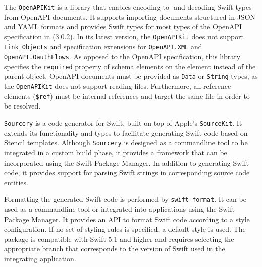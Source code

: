 The \texttt{OpenAPIKit} is a library that enables encoding to- and decoding Swift types from OpenAPI documents. It supports importing documents structured in JSON and YAML formats and provides Swift types for most types of the OpenAPI specification in (3.0.2). In its latest version, the \texttt{OpenAPIKit} does not support \texttt{Link Objects} and specification extensions for \texttt{OpenAPI.XML} and \texttt{OpenAPI.Oauth\-Flows}. As opposed to the OpenAPI specification, this library specifies the \texttt{re\-qui\-red} property of schema elements on the element instead of the parent object. OpenAPI documents must be provided as \texttt{Data} or \texttt{String} types, as the \texttt{OpenAPIKit} does not support reading files. Furthermore, all reference elements (\texttt{\$ref}) must be internal references and target the same file in order to be resolved.

\texttt{Sourcery} is a code generator for Swift, built on top of Apple's \texttt{SourceKit}. It extends its functionality and types to facilitate generating Swift code based on Stencil templates. Although \texttt{Sourcery} is designed as a commandline tool to be integrated in a custom build phase, it provides a framework that can be incorporated using the Swift Package Manager. In addition to generating Swift code, it provides support for parsing Swift strings in corresponding source code entities. 

Formatting the generated Swift code is performed by \texttt{swift-format}. It can be used as a commandline tool or integrated into applications using the Swift Package Manager. It provides an API to format Swift code according to a style configuration. If no set of styling rules is specified, a default style is used. The package is compatible with Swift 5.1 and higher and requires selecting the appropriate branch that corresponds to the version of Swift used in the integrating application.






